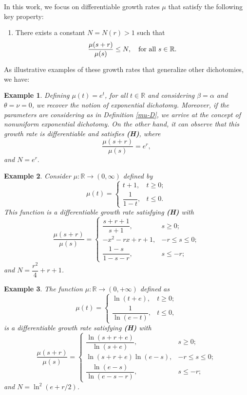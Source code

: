 \documentclass[9pt]{amsart}
\newtheorem{example}{Example}
\numberwithin{equation}{section}
\numberwithin{lemma}{section}
\begin{document}
In this work, we focus on differentiable growth rates $\mu$ that satisfy the following key property:

\begin{enumerate}
    \item[(\textbf{H})] There exists a constant $N=N(r)>1$ such that
    \begin{equation*}
    \frac{\mu(s+r)}{\mu(s)}\leq N, \quad \textnormal{for all } s\in \mathbb{R}.
\end{equation*}
\end{enumerate}

As illustrative examples of these growth rates that generalize other dichotomies, we have:

\begin{example}
    Defining $\mu(t)=e^t$, for all $t\in\mathbb{R}$ and considering $\beta=\alpha$ and $\theta=\nu=0$, we recover the notion of exponential dichotomy. Moreover, if the parameters are considering as in Definition  \ref{mu-D}, we arrive at the concept of nonuniform exponential dichotomy. On the other hand, it can observe that this  growth rate is differentiable and satisfies \textbf{(H)}, where 
    $$\frac{\mu(s+r)}{\mu(s)}=e^r,$$
    and $N=e^r.$
\end{example}

\begin{example}
    Consider $\mu:\mathbb{R}\to(0,\infty)$ defined by
    $$\mu(t)=\left\{\begin{array}{cc}
        t+1, & t\geq0; \\
        \dfrac{1}{1-t}, & t\leq0.
    \end{array}\right.$$
    This function is a differentiable growth rate satisfying \textbf{(H)} with 
    $$\frac{\mu(s+r)}{\mu(s)}=\left\{\begin{array}{cc}
       \dfrac{s+r+1}{s+1},  & s\geq0; \\
        -x^2-rx+r+1, & -r\leq s\leq 0;\\
        \dfrac{1-s}{1-s-r}, & s\leq -r;
    \end{array}\right.$$
    and $N=\dfrac{r^2}{4}+r+1$.
\end{example}

\begin{example}
    The function $\mu:\mathbb{R}\to(0,+\infty)$ defined as
    $$\mu(t)=\left\{\begin{array}{cc}
        \ln(t+e), & t\geq0; \\
        \dfrac{1}{\ln(e-t)}, & t\leq0,
    \end{array}\right.$$
    is a differentiable growth rate satisfying \textbf{(H)} with 
    $$\frac{\mu(s+r)}{\mu(s)}=\left\{\begin{array}{cc}
       \dfrac{\ln(s+r+e)}{\ln(s+e)},  & s\geq0; \\
        \ln(s+r+e)\ln(e-s), & -r\leq s\leq 0;\\
        \dfrac{\ln(e-s)}{\ln(e-s-r)}, & s\leq -r;
    \end{array}\right.$$
    and $N=\ln^2(e+r/2)$.
    
\end{example}
\end{document}
